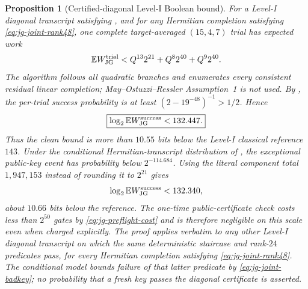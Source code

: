 \documentclass[11pt]{article}
\newtheorem{proposition}[theorem]{Proposition}
\begin{document}
\begin{proposition}[Certified-diagonal Level-I Boolean bound]
\label{prop:jg-level1-gates}
For a Level-I diagonal transcript satisfying , and for
any Hermitian completion satisfying \eqref{eq:jg-joint-rank48}, one complete
target-averaged $(15,4,7)$
trial has expected work
\begin{equation}
 \mathbb E W_{\rm JG}^{\rm trial}
 <Q^{13}2^{21}+Q^8 2^{40}+Q^9 2^{40}.                \label{eq:jg-expected-work}
\end{equation}
The algorithm follows all quadratic branches and enumerates every consistent
residual linear completion; May--Ostuzzi--Ressler Assumption~1 is not used.
By , the per-trial success probability is
at least $(2-19^{-48})^{-1}>1/2$.  Hence
\begin{equation}
 \boxed{\log_2\mathbb E W_{\rm JG}^{\rm success}<132.447.}
 \label{eq:jg-numerical}
\end{equation}
Thus the clean bound is more than $10.55$ bits below the Level-I classical
reference $143$.  Under the conditional Hermitian-transcript distribution of
, the exceptional public-key event has probability
below $2^{-114.684}$.  Using the literal component total $1{,}947{,}153$ instead
of rounding it to $2^{21}$ gives
\begin{equation}
  \log_2\mathbb E W_{\rm JG}^{\rm success}<132.340,
  \label{eq:jg-literal-numerical}
\end{equation}
about $10.66$ bits below the reference.  The one-time public-certificate check
costs less than $2^{50}$ gates by \eqref{eq:jg-preflight-cost} and is therefore
negligible on this scale even when charged explicitly.  The proof applies verbatim to any other Level-I diagonal transcript on which
the same deterministic staircase and rank-$24$ predicates pass, for every
Hermitian completion satisfying \eqref{eq:jg-joint-rank48}.  The conditional
model bounds failure of that latter predicate by \eqref{eq:jg-joint-badkey};
no probability that a fresh key passes the diagonal certificate is asserted.
\end{proposition}
\end{document}
